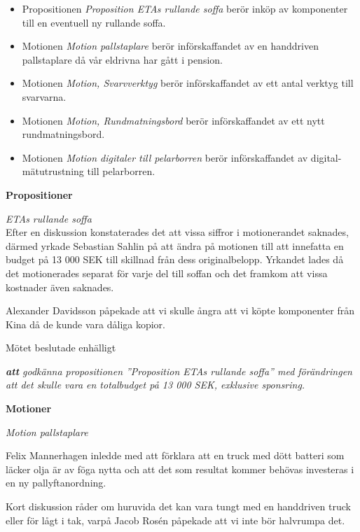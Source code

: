 \begin{itemize}

    \item Propositionen \emph{Proposition ETAs rullande soffa} berör inköp av komponenter till en eventuell ny rullande soffa.

    \item Motionen \emph{Motion pallstaplare} berör införskaffandet av en handdriven pallstaplare då vår eldrivna har gått i pension.

    \item Motionen \emph{Motion, Svarvverktyg} berör införskaffandet av ett antal verktyg till svarvarna.

    \item Motionen \emph{Motion, Rundmatningsbord} berör införskaffandet av ett nytt rundmatningsbord.

    \item Motionen \emph{Motion digitaler till pelarborren} berör införskaffandet av digital-mätutrustning till pelarborren.
\end{itemize}


\textbf{Propositioner}

    \emph{ETAs rullande soffa}\\
Efter en diskussion konstaterades det att vissa siffror i motionerandet saknades, därmed yrkade Sebastian Sahlin på att ändra på motionen till att innefatta en budget på 13 000 SEK till skillnad från dess originalbelopp. Yrkandet lades då det motionerades separat för varje del till soffan och det framkom att vissa kostnader även saknades.

Alexander Davidsson påpekade att vi skulle ångra att vi köpte komponenter från Kina då de kunde vara dåliga kopior. 



Mötet beslutade enhälligt

\emph{\textbf{att} godkänna propositionen  ''Proposition ETAs rullande soffa'' med förändringen att det skulle vara en totalbudget på 13 000 SEK, exklusive sponsring.}


\newpage
\textbf{Motioner}

    \emph{Motion pallstaplare}
    
    Felix Mannerhagen inledde med att förklara att en truck med dött batteri som läcker olja är av föga nytta och att det som resultat kommer behövas investeras i en ny pallyftanordning.
    
    Kort diskussion råder om huruvida det kan vara tungt med en handdriven truck eller för lågt i tak, varpå Jacob Rosén påpekade att vi inte bör halvrumpa det.
    
